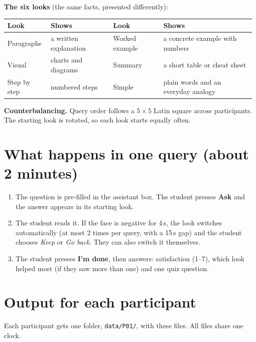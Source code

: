 \documentclass[10pt,a4paper]{article}
\begin{document}
\textbf{The six looks} (the same facts, presented differently):
\begin{center}
\small
\begin{tabularx}{\linewidth}{@{}p{2.6cm} L p{2.6cm} L@{}}
\toprule
\textbf{Look} & \textbf{Shows} & \textbf{Look} & \textbf{Shows} \\
\midrule
Paragraphs & a written explanation & Worked example & a concrete example with numbers \\
Visual & charts and diagrams & Summary & a short table or cheat sheet \\
Step by step & numbered steps & Simple & plain words and an everyday analogy \\
\bottomrule
\end{tabularx}
\end{center}

\textbf{Counterbalancing.} Query order follows a $5\times5$ Latin square across participants. The starting look is rotated,
so each look starts equally often.

\section{What happens in one query (about 2 minutes)}
\begin{enumerate}
  \item The question is pre-filled in the assistant box. The student presses \textbf{Ask} and the answer appears in its starting look.
  \item The student reads it. If the face is negative for 4\,s, the look switches automatically (at most 2 times per
        query, with a 15\,s gap) and the student chooses \emph{Keep} or \emph{Go back}. They can also switch it themselves.
  \item The student presses \textbf{I'm done}, then answers: satisfaction (1--7), which look helped most (if they saw
        more than one) and one quiz question.
\end{enumerate}

\section{Output for each participant}
Each participant gets one folder, \texttt{data/P01/}, with these files. All files share one clock.
\end{document}
